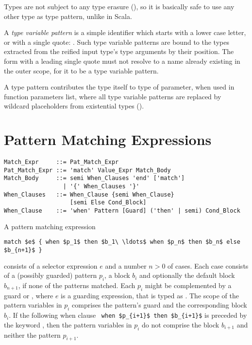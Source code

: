 Types are not subject to any type erasure (), so it is basically safe to use any other type as type pattern, unlike in Scala. 

A {\em type variable pattern} is a simple identifier which starts with a lower case letter, or with a single quote: . Such type variable patterns are bound to the types extracted from the reified input type's type arguments by their position. The form with a leading single quote must not resolve to a name already existing in the outer scope, for it to be a type variable pattern. 

A type pattern contributes the type itself to type of parameter, when used in function parameters list, where all type variable patterns are replaced by wildcard placeholders from existential types ().





\section{Pattern Matching Expressions}

\syntax\begin{lstlisting}
Match_Expr     ::= Pat_Match_Expr
Pat_Match_Expr ::= 'match' Value_Expr Match_Body
Match_Body     ::= semi When_Clauses 'end' ['match']
                 | '{' When_Clauses '}'
When_Clauses   ::= When_Clause {semi When_Clause} 
                   [semi Else Cond_Block]
When_Clause    ::= 'when' Pattern [Guard] ('then' | semi) Cond_Block
\end{lstlisting}

A pattern matching expression 
\begin{lstlisting}
match $e$ { when $p_1$ then $b_1\ \ldots$ when $p_n$ then $b_n$ else $b_{n+1}$ }
\end{lstlisting}
consists of a selector expression $e$ and a number $n > 0$ of cases. Each case consists of a (possibly guarded) pattern $p_i$, a block $b_i$ and optionally the default block $b_{n+1}$, if none of the patterns matched. Each $p_i$ might be complemented by a guard  or , where $e$ is a guarding expression, that is typed as . The scope of the pattern variables in $p_i$ comprises the pattern's guard and the corresponding block $b_i$. If the following when clause ~\lstinline!when $p_{i+1}$ then $b_{i+1}$! is preceded by the keyword , then the pattern variables in $p_i$ do not comprise the block $b_{i+1}$ and neither the pattern $p_{i+1}$. 


